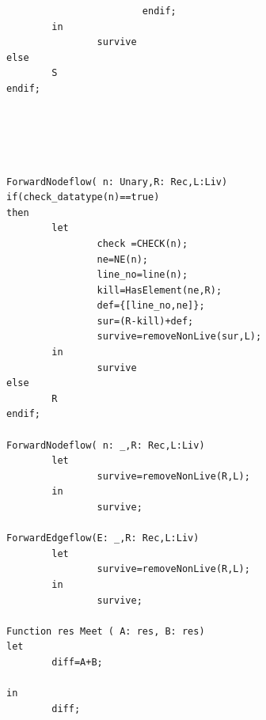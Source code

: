 \documentclass[11pt,a4paper,openright]{report}
\begin{document}
\begin{lstlisting}
                        endif;
        in
                survive
else
        S
endif;





ForwardNodeflow( n: Unary,R: Rec,L:Liv)
if(check_datatype(n)==true)
then
        let
                check =CHECK(n);
                ne=NE(n);
                line_no=line(n);
                kill=HasElement(ne,R);
                def={[line_no,ne]};
                sur=(R-kill)+def;
                survive=removeNonLive(sur,L);
        in
                survive
else
        R
endif;

ForwardNodeflow( n: _,R: Rec,L:Liv)
        let
                survive=removeNonLive(R,L);
        in
                survive;

ForwardEdgeflow(E: _,R: Rec,L:Liv)
        let
                survive=removeNonLive(R,L);
        in
                survive;

Function res Meet ( A: res, B: res)
let
        diff=A+B;

in
        diff;

                                                                                                           


\end{lstlisting}


\renewcommand{\bibname}{References}
\begin{small}


\end{small}
\end{document}
